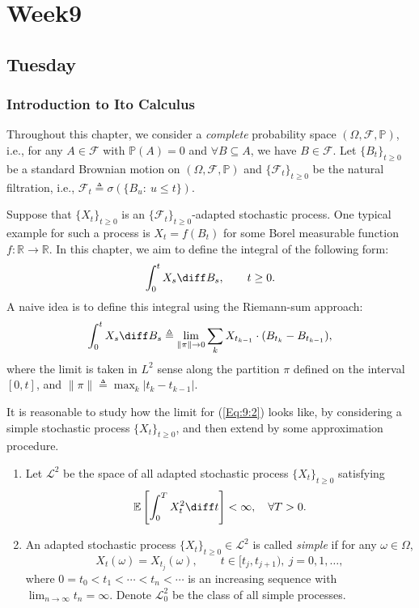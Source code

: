 
\chapter{Week9}

\section{Tuesday}

\subsection{Introduction to Ito Calculus}

Throughout this chapter, we consider a \emph{complete} probability space $(\Omega,\mathcal{F},\mathbb{P})$, i.e.,
for any $A\in\mathcal{F}$ with $\mathbb{P}(A)=0$ and $\forall B\subseteq A$, we have $B\in\mathcal{F}$.
Let $\{B_t\}_{t\ge0}$ be a standard Brownian motion on $(\Omega,\mathcal{F},\mathbb{P})$ and $\{\mathcal{F}_t\}_{t\ge0}$ be the natural filtration, i.e., $\mathcal{F}_t\triangleq \sigma(\{B_u:~u\le t\})$.

Suppose that $\{X_t\}_{t\ge0}$ is an $\{\mathcal{F}_t\}_{t\ge0}$-adapted stochastic process. One typical example for such a process is $X_t=f(B_t)$ for some Borel measurable function $f:\mathbb{R}\to\mathbb{R}$.
In this chapter, we aim to define the integral of the following form:
\begin{equation}
\int_0^tX_s\diff B_s,\qquad t\ge0.
\end{equation}
A naive idea is to define this integral using the Riemann-sum approach:
\begin{equation}\label{Eq:9:2}
\int_0^tX_s\diff B_s\triangleq\lim_{\|\pi\|\to0}\sum_kX_{t_{k-1}}\cdot(B_{t_k} - B_{t_{k-1}}),
\end{equation}
where the limit is taken in $L^2$ sense along the partition $\pi$ defined on the interval $[0,t]$, and 
$\|\pi\|\triangleq\max_k|t_k - t_{k-1}|$.

It is reasonable to study how the limit for (\ref{Eq:9:2}) looks like, by considering a simple stochastic process $\{X_t\}_{t\ge0}$, and then extend by some approximation procedure.

\begin{definition}
\begin{enumerate}
\item
Let $\mathcal{L}^2$ be the space of all adapted stochastic process $\{X_t\}_{t\ge0}$ satisfying 
\[
\mathbb{E}\left[
\int_0^TX_t^2\diff t
\right]<\infty,\quad \forall T>0.
\]
\item
An adapted stochastic process $\{X_t\}_{t\ge0}\in\mathcal{L}^2$ is called \emph{simple} if for any $\omega\in\Omega$,
\[
X_t(\omega)=X_{t_j}(\omega),\qquad t\in[t_j,t_{j+1}),~j=0,1,\ldots,
\]
where $0=t_0<t_1<\cdots<t_n<\cdots$ is an increasing sequence with $\lim_{n\to\infty}t_n=\infty$.
Denote $\mathcal{L}_0^2$ be the class of all simple processes.
\end{enumerate}
\end{definition}


